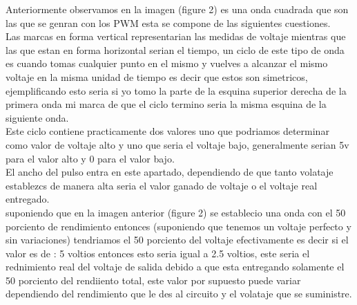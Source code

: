 \documentclass[12pt]{article}
\begin{document}
Anteriormente observamos en la imagen (figure 2) es una onda cuadrada que son las que se genran con los PWM esta se compone de las siguientes cuestiones.\\
Las marcas en forma vertical representarian las medidas de voltaje mientras que las que estan en forma horizontal serian el tiempo, un ciclo de este tipo de onda es cuando tomas cualquier punto en el mismo y vuelves a alcanzar el mismo voltaje en la misma unidad de tiempo es decir que estos son simetricos, ejemplificando esto seria si yo tomo la parte de la esquina superior derecha de la primera onda mi marca de que el ciclo termino seria la misma esquina de la siguiente onda.\\
Este ciclo contiene practicamente dos valores uno que podriamos determinar como valor de voltaje alto y uno que seria el voltaje bajo, generalmente serian 5v para el valor alto y 0 para el valor bajo.\\
El ancho del pulso entra en este apartado, dependiendo de que tanto volataje establezcs de manera alta seria el valor ganado de voltaje o el voltaje real entregado.\\
suponiendo que en la imagen anterior (figure 2) se establecio una onda con el 50 porciento de rendimiento entonces (suponiendo que tenemos un voltaje perfecto y sin variaciones) tendriamos el 50 porciento del voltaje efectivamente es decir si el valor es de :
5 voltios entonces esto seria igual a 2.5 voltios, este seria el rednimiento real del voltaje de salida debido a que esta entregando solamente el 50 porciento del rendiiento total, este valor por supuesto puede variar dependiendo del rendimiento que le des al circuito y el volataje que se suministre.\\
\end{document}
